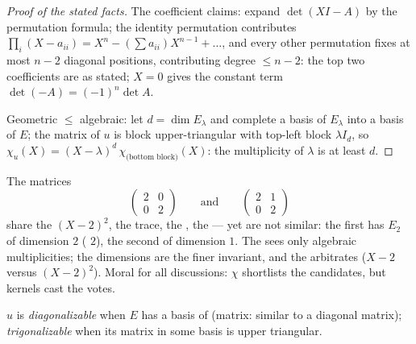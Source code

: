 \begin{proof}[Proof of the stated facts]
The coefficient claims: expand $\det(XI - A)$ by the permutation
formula; the identity permutation contributes $\prod_i (X - a_{ii})
= X^n - (\sum a_{ii})X^{n-1} + \dots$, and every other permutation
fixes at most $n - 2$ diagonal positions, contributing degree $\leq
n - 2$: the top two coefficients are as stated; $X = 0$ gives the
constant term $\det(-A) = (-1)^n\det A$.

Geometric $\leq$ algebraic: let $d = \dim E_\lambda$ and complete a
basis of $E_\lambda$ into a basis of $E$; the matrix of $u$ is block
upper-triangular with top-left block $\lambda I_d$, so $\chi_u(X) =
(X - \lambda)^d\, \chi_{\text{(bottom block)}}(X)$: the multiplicity
of $\lambda$ is at least $d$.
\end{proof}

\begin{example}\label{ex:b2:reduction:samechi}
The matrices
\[
\begin{pmatrix}2 & 0\\ 0 & 2\end{pmatrix}
\qquad\text{and}\qquad
\begin{pmatrix}2 & 1\\ 0 & 2\end{pmatrix}
\]
share the  $(X - 2)^2$, the trace, the
, the  --- yet are not similar: the first has
$E_2$ of dimension $2$ ( $2$), the second
of dimension $1$. The  sees only
algebraic multiplicities; the  dimensions are the
finer invariant, and the  arbitrates ($X - 2$
versus $(X - 2)^2$). Moral for all 
discussions: $\chi$ shortlists the candidates, but kernels cast
the votes.
\end{example}

\begin{definition}\label{def:b2:reduction:diag}
$u$ is \emph{diagonalizable} when $E$ has a
basis of  (matrix: similar to a diagonal matrix);
\emph{trigonalizable} when its matrix in some
basis is upper triangular.
\end{definition}

